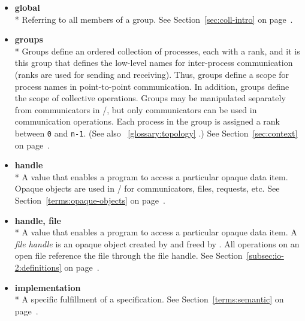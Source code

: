 \begin{itemize}
\label{glossary:global}
\item \textbf{ global} \\*
Referring to all members of a group.
See Section~\ref{sec:coll-intro} on page~\pageref{sec:coll-intro}.

\label{glossary:groups}
\item \textbf{ groups} \\*
Groups define an ordered collection of processes, each with a rank, and it is this
group that defines the low-level names for inter-process communication (ranks
are used for sending and receiving).  Thus, groups define a scope for process
names in point-to-point communication.  In addition, groups define the scope
of collective operations.  Groups may be manipulated separately from
communicators in \MPI/, but only communicators can be used in
communication operations. Each process in
the group is assigned a rank between {\tt 0} and {\tt n-1}.
(See also ~\ref{glossary:topology} .)
See Section~\ref{sec:context} on page~\pageref{sec:context}.

\label{glossary:handle}
\item \textbf{ handle} \\* 
A value that enables a program to access a particular opaque data item.
Opaque objects are used in \MPI/ for communicators, files, requests, etc.
See Section~\ref{terms:opaque-objects} on page~\pageref{terms:opaque-objects}.

\label{glossary:handle, file}
\item \textbf{ handle, file} \\* 
A value that enables a program to access a particular opaque data item.
A {\it file handle} is an opaque object created by 
and freed by .
All operations on an open file
reference the file through the file handle.
See Section~\ref{subsec:io-2:definitions} on page~\pageref{subsec:io-2:definitions}.

\label{glossary:implementation}
\item \textbf{ implementation} \\*
A specific fulfillment of a specification.  
See Section~\ref{terms:semantic} on page~\pageref{terms:semantic}.


\end{itemize}
